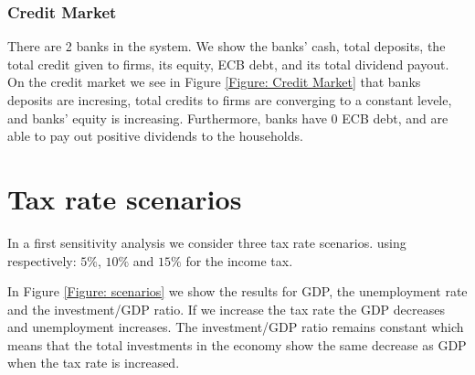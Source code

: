 \documentclass{article}
\begin{document}
\subsubsection*{Credit Market}
There are 2 banks in the system. 
We show the banks' cash, total deposits, the total credit given to firms, its equity, ECB debt, and its total dividend payout.
On the credit market we see in Figure \ref{Figure: Credit Market} that banks deposits are incresing, total credits to firms are converging to a constant levele, and banks' equity is increasing. Furthermore, banks have 0 ECB debt, and are able to pay out positive dividends to the households.


\section{Tax rate scenarios}
In a first sensitivity analysis we consider three tax rate scenarios. using respectively: $5\%$, $10\%$ and $15\%$ for the income tax.

In Figure \ref{Figure: scenarios} we show the results for GDP, the unemployment rate and the investment/GDP ratio.
If we increase the tax rate the GDP decreases and unemployment increases. The investment/GDP ratio remains constant which means that the total investments in the economy show the same decrease as GDP when the tax rate is increased.





\end{document}

